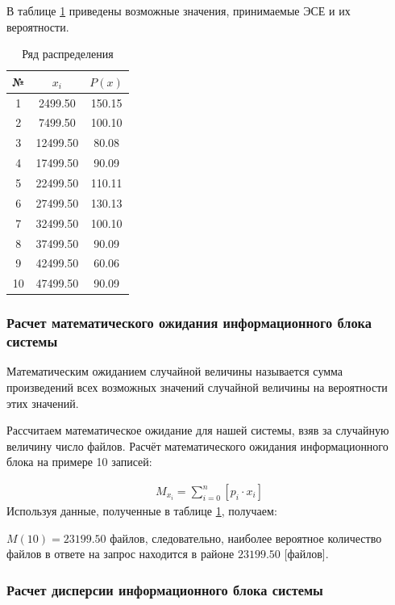 \documentclass[a4paper,14pt]{extarticle}
\begin{document}
В таблице \ref{tab:probs} приведены возможные значения, принимаемые ЭСЕ и их вероятности.

\begin{table}[h!]
	\centering
	\caption{Ряд распределения}
	\begin{tabular}{|c|c|c|}
		\hline
		№ &	$x_i$ & $P(x)$ \\ \hline\hline
		1 &	2499.50 & 150.15 \\ \hline
		2 &		7499.50 & 100.10 \\ \hline
		3 &		12499.50 & 80.08 \\ \hline
		4 &		17499.50 & 90.09 \\ \hline
		5 &		22499.50 & 110.11 \\ \hline
		6 &		27499.50 & 130.13 \\ \hline
		7 &		32499.50 & 100.10 \\ \hline
		8 &		37499.50 & 90.09 \\ \hline
		9 &		42499.50 & 60.06 \\ \hline
		10 &		47499.50 & 90.09 \\ \hline
	\end{tabular}
	\label{tab:probs}
\end{table}

\subsubsection{Расчет математического ожидания информационного блока системы}
Математическим ожиданием случайной величины называется сумма
произведений всех возможных значений случайной величины на вероятности
этих значений. 

Рассчитаем математическое ожидание для нашей системы, взяв
за случайную величину число файлов. Расчёт математического
ожидания информационного блока на примере 10 записей:

\begin{align}
M_{x_{i}} = \sum_{i=0}^{n}\left[p_i \cdot x_i\right] \label{math:expectation}
\end{align}
Используя данные, полученные в таблице \ref{tab:probs}, получаем:

$M(10) = 23199.50$ файлов, следовательно, наиболее вероятное
количество файлов в ответе на запрос находится в районе $23199.50$ [файлов].

\subsubsection{Расчет дисперсии информационного блока системы}
\end{document}
